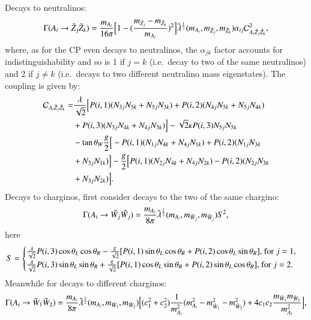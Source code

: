 \documentclass[final,3p,times,pdflatex]{elsarticle}
\begin{document}
Decays to neutralinos:
\begin{equation} \label{AneutneutNMSSM}
\Gamma(A_i \rightarrow \tilde{Z}_j \tilde{Z}_k) = {m_{A_i} \over 16 \pi} \Big[1 - ({m_{\tilde{Z}_j} - m_{\tilde{Z}_k} \over m_{A_i}})^2\Big] \tilde{\lambda}^{1 \over 2}(m_{A_i},m_{\tilde{Z}_j}, m_{\tilde{Z}_k}) \alpha_{ij} \mathcal{C}_{A_i \tilde{Z}_j \tilde{Z}_k}^2,
\end{equation}
where, as for the CP even decays to neutralinos, the $\alpha_{jk}$ factor accounts for indistinguishability and so is 1 if $j=k$ (i.e.\ decay to two of the same neutralinos) and 2 if $j\neq k$ (i.e.\ decays to two different neutralino mass eigenstates).
The coupling is given by:
\begin{equation}
\begin{aligned}
\mathcal{C}_{A_i \tilde{Z}_j \tilde{Z}_k} = & {\lambda \over \sqrt{2}}\Big[P(i,1)(N_{3j}N_{5k} + N_{5j}N_{3k}) + P(i,2)(N_{4j}N_{5k} + N_{5j}N_{4k}) \\ & + P(i,3)(N_{3j}N_{4k} + N_{4j}N_{3k})\Big] - \sqrt{2}\kappa P(i,3)N_{5j}N_{5k} \\ & - \tan\theta_W {g \over 2}\Big[-P(i,1)(N_{1j}N_{4k} + N_{4j}N_{1k}) + P(i,2)(N_{1j}N_{3k} \\ & + N_{3j}N_{1k})\Big] - {g \over 2}\Big[P(i,1)(N_{2j}N_{4k} + N_{4j}N_{2k}) - P(i,2)(N_{2j}N_{3k} \\ & + N_{3j}N_{2k})\Big].
\end{aligned}
\end{equation}
Decays to charginos, first consider decays to the two of the same chargino:
\begin{equation} \label{AchchNMSSM}
\Gamma(A_i \rightarrow \tilde{W_{j}} \tilde{W_{j}}) = {m_{A_i} \over 8 \pi} \tilde{\lambda}^{1 \over 2}(m_{A_i},m_{\tilde{W}_j}, m_{\tilde{W}_j}) S^2,
\end{equation}
here
\begin{equation}
S = \begin{cases}
	{\lambda \over \sqrt{2}}P(i,3)\cos\theta_L \cos\theta_R - {g \over \sqrt{2}}[P(i,1)\sin\theta_L \cos \theta_R + P(i,2) \cos\theta_L \sin\theta_R] $, for $j=1, \\
	{\lambda \over \sqrt{2}}P(i,3)\sin\theta_L \sin\theta_R + {g \over \sqrt{2}}[P(i,1)\cos\theta_L \sin \theta_R + P(i,2) \sin\theta_L \cos\theta_R] $, for $j=2. \\
	\end{cases}
\end{equation}
Meanwhile for decays to different charginos:
\begin{equation} \label{Ach1ch2NMSSM}
\Gamma(A_i \rightarrow \tilde{W}_1 \tilde{W}_2) = {m_{A_i} \over 8 \pi} \tilde{\lambda}^{1 \over 2}(m_{A_i},m_{\tilde{W}_1},m_{\tilde{W}_2})\Big[(c_{1}^2 + c_{2}^2){1 \over m_{A_i}^2}(m_{A_i}^2 - m_{\tilde{W}_1}^2 - m_{\tilde{W}_2}^2) + 4c_{1}c_{2}{m_{\tilde{W}_1}m_{\tilde{W}_2} \over m_{A_i}^2}\Big],
\end{equation}
\end{document}
